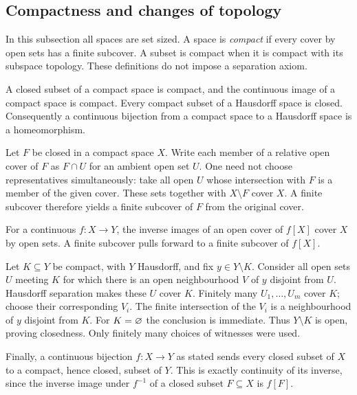 \pagebreak



\subsection{Compactness and changes of topology}
In this subsection all spaces are set sized. A space is \emph{compact}
if every cover by open sets has a finite subcover. A subset is compact
when it is compact with its subspace topology. These definitions do
not impose a separation axiom.

\begin{theorem}
\label{thm:compactness_transport}
A closed subset of a compact space is compact, and the continuous
image of a compact space is compact. Every compact subset of a
Hausdorff space is closed. Consequently a continuous bijection from
a compact space to a Hausdorff space is a homeomorphism.
\end{theorem}
\Proof
Let $F$ be closed in a compact space $X$. Write each member of a
relative open cover of $F$ as $F\cap U$ for an ambient open set $U$.
One need not choose representatives simultaneously: take all open
$U$ whose intersection with $F$ is a member of the given cover.
These sets together with $X\setminus F$ cover $X$. A finite subcover
therefore yields a finite subcover of $F$ from the original cover.

For a continuous $f:X\to Y$, the inverse images of an open cover of
$f[X]$ cover $X$ by open sets. A finite subcover pulls forward to a
finite subcover of $f[X]$.

Let $K\subseteq Y$ be compact, with $Y$ Hausdorff, and fix
$y\in Y\setminus K$. Consider all open sets $U$ meeting $K$ for
which there is an open neighbourhood $V$ of $y$ disjoint from $U$.
Hausdorff separation makes these $U$ cover $K$. Finitely many
$U_1,\ldots,U_m$ cover $K$; choose their corresponding $V_i$.
The finite intersection of the $V_i$ is a neighbourhood of $y$
disjoint from $K$. For $K=\varnothing$ the conclusion is immediate.
Thus $Y\setminus K$ is open, proving closedness. Only finitely many
choices of witnesses were used.

Finally, a continuous bijection $f:X\to Y$ as stated sends every
closed subset of $X$ to a compact, hence closed, subset of $Y$.
This is exactly continuity of its inverse, since the inverse image
under $f^{-1}$ of a closed subset $F\subseteq X$ is $f[F]$.
\Done

